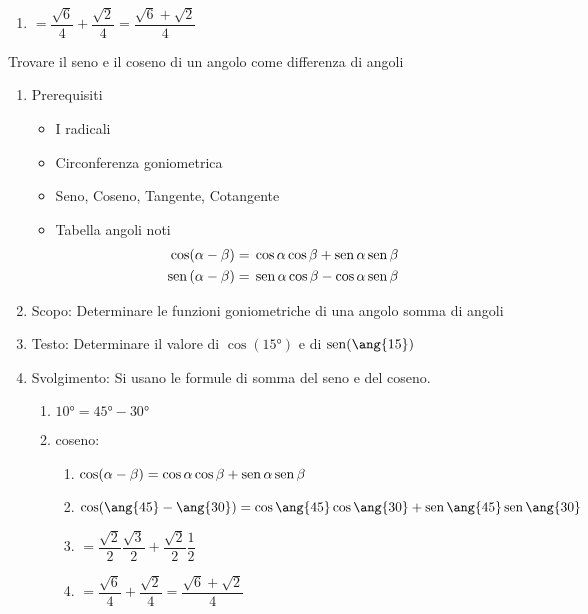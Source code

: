 {\begin{table}[H]
\begin{enumerate}
\begin{enumerate}
\begin{enumerate}
			\item $=\dfrac{\sqrt{6}}{4}+\dfrac{\sqrt{2}}{4}=\dfrac{\sqrt{6}+\sqrt{2}}{4}$
		\end{enumerate}
	 \end{enumerate}
\end{enumerate}
\end{table}
\begin{table}[H]
	\caption{Trovare il seno e il coseno di un angolo come differenza di angoli}
	\label{tab:Trovarediffangoli1}
	\begin{enumerate}
		\item Prerequisiti 
		\begin{itemize}
			\item I radicali
			\item Circonferenza goniometrica
			\item Seno, Coseno, Tangente, Cotangente
			\item Tabella angoli noti
			\begin {align*}
			\cos(\alpha-\beta)=	{}&\cos\alpha\cos\beta+\operatorname{sen}\alpha\operatorname{sen}\beta \\ 
			\operatorname{sen}\left(\alpha-\beta\right)={} &\operatorname{sen}\alpha\cos\beta-\cos\alpha\operatorname{sen}\beta\\
		\end{align*}
	\end{itemize}
	\item Scopo: Determinare le funzioni goniometriche di una angolo somma di angoli
	\item Testo: Determinare il valore di $\cos(\ang{15})$ e di $\sen(\ang{15})$
	\item Svolgimento: Si usano le formule di somma  del seno e del coseno.
	\begin{enumerate}
		\item $\ang{10}=\ang{45}-\ang{30}$
		\item coseno:
		\begin{enumerate}
			\item $\cos(\alpha-\beta)=\cos\alpha\cos\beta+\operatorname{sen}\alpha\operatorname{sen}\beta$
			\item $\cos(\ang{45}-\ang{30})=\cos\ang{45}\cos\ang{30}+\sen\ang{45}\sen\ang{30}$
			\item $=\dfrac{\sqrt{2}}{2}\dfrac{\sqrt{3}}{2}+\dfrac{\sqrt{2}}{2}\dfrac{1}{2}$
			\item $=\dfrac{\sqrt{6}}{4}+\dfrac{\sqrt{2}}{4}=\dfrac{\sqrt{6}+\sqrt{2}}{4}$

\end{enumerate}
\end{enumerate}
\end{enumerate}
\end{table}}
